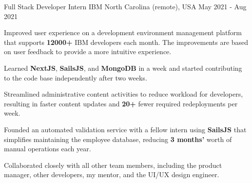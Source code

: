 \begin{cventries}
    \cventry
    {Full Stack Developer Intern} %
    {IBM} %
    {North Carolina (remote), USA} %
    {May 2021 - Aug 2021} %
    {
      \begin{cvitems} %
        \item {Improved user experience on a development environment management platform that supports \textbf{12000+} IBM developers each month. The improvements are based on user feedback to provide a more intuitive experience.}
      \item {Learned \textbf{NextJS}, \textbf{SailsJS}, and \textbf{MongoDB} in a week and started contributing to the code base independently after two weeks.}
        \item {Streamlined administrative content activities to reduce workload for developers, resulting in faster content updates and \textbf{20+} fewer required redeployments per week.}
        \item {Founded an automated validation service with a fellow intern using \textbf{SailsJS} that simplifies maintaining the employee database, reducing \textbf{3 months'} worth of manual operations each year.}
        \item {Collaborated closely with all other team members, including the product manager, other developers, my mentor, and the UI/UX design engineer.}
      \end{cvitems}
    }



\end{cventries}
